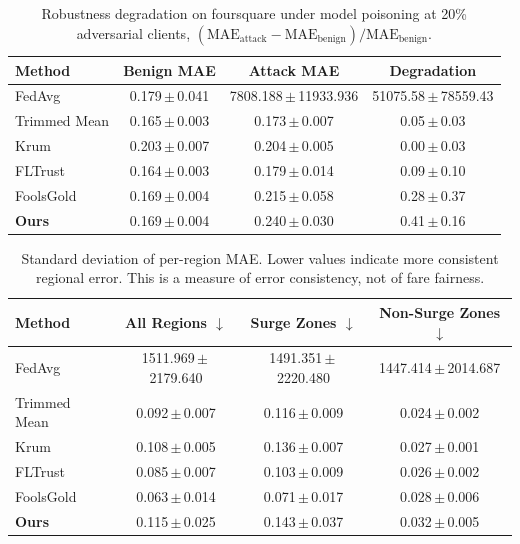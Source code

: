 \begin{table}[t]
\centering
\scriptsize
\caption{Robustness degradation on foursquare under model poisoning at 20\% adversarial clients, $(\mathrm{MAE}_{\mathrm{attack}}-\mathrm{MAE}_{\mathrm{benign}})/\mathrm{MAE}_{\mathrm{benign}}$.}
\label{tab:degradation}
\begin{tabular}{lccc}
\toprule
\textbf{Method} & \textbf{Benign MAE} & \textbf{Attack MAE} & \textbf{Degradation} \\
\midrule
FedAvg & 0.179\,$\pm$\,0.041 & 7808.188\,$\pm$\,11933.936 & 51075.58\,$\pm$\,78559.43 \\
Trimmed Mean & 0.165\,$\pm$\,0.003 & 0.173\,$\pm$\,0.007 & 0.05\,$\pm$\,0.03 \\
Krum & 0.203\,$\pm$\,0.007 & 0.204\,$\pm$\,0.005 & 0.00\,$\pm$\,0.03 \\
FLTrust & 0.164\,$\pm$\,0.003 & 0.179\,$\pm$\,0.014 & 0.09\,$\pm$\,0.10 \\
FoolsGold & 0.169\,$\pm$\,0.004 & 0.215\,$\pm$\,0.058 & 0.28\,$\pm$\,0.37 \\
\textbf{Ours} & 0.169\,$\pm$\,0.004 & 0.240\,$\pm$\,0.030 & 0.41\,$\pm$\,0.16 \\
\bottomrule
\end{tabular}
\end{table}

\begin{table}[t]
\centering
\scriptsize
\caption{Standard deviation of per-region MAE. Lower values indicate more consistent regional error. This is a measure of error consistency, not of fare fairness.}
\label{tab:fairness}
\renewcommand{\arraystretch}{1.1}
\begin{tabular}{lccc}
\toprule
\textbf{Method} & \textbf{All Regions $\downarrow$} & \textbf{Surge Zones $\downarrow$} & \textbf{Non-Surge Zones $\downarrow$} \\
\midrule
FedAvg & 1511.969\,$\pm$\,2179.640 & 1491.351\,$\pm$\,2220.480 & 1447.414\,$\pm$\,2014.687 \\
Trimmed Mean & 0.092\,$\pm$\,0.007 & 0.116\,$\pm$\,0.009 & 0.024\,$\pm$\,0.002 \\
Krum & 0.108\,$\pm$\,0.005 & 0.136\,$\pm$\,0.007 & 0.027\,$\pm$\,0.001 \\
FLTrust & 0.085\,$\pm$\,0.007 & 0.103\,$\pm$\,0.009 & 0.026\,$\pm$\,0.002 \\
FoolsGold & 0.063\,$\pm$\,0.014 & 0.071\,$\pm$\,0.017 & 0.028\,$\pm$\,0.006 \\
\textbf{Ours} & 0.115\,$\pm$\,0.025 & 0.143\,$\pm$\,0.037 & 0.032\,$\pm$\,0.005 \\
\bottomrule
\end{tabular}
\end{table}


